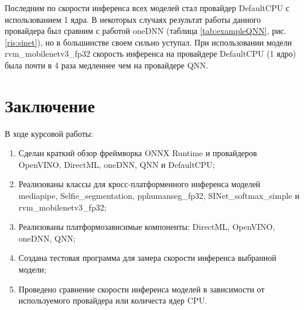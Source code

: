 \documentclass[a4paper,14pt]{extreport}
\begin{document}
        Последним по скорости инференса всех моделей стал провайдер DefaultCPU с использованием 1 ядра. В некоторых случаях результат работы данного провайдера был сравним с работой oneDNN (таблица \ref{tab:exampleQNN}, рис. \ref{ris:sinet}), но в большинстве своем сильно уступал. При использовании модели rvm\_mobilenetv3\_fp32 скорость инференса на провайдере DefaultCPU (1 ядро) была почти в 4 раза медленнее чем на провайдере QNN.

    \chapter*{Заключение}
    В ходе курсовой работы:
    \begin{enumerate}
        \item Сделан краткий обзор фреймворка ONNX Runtime и провайдеров OpenVINO, DirectML, oneDNN, QNN и DefaultCPU;
        \item Реализованы классы для кросс-платформенного инференса моделей mediapipe, Selfie\_segmentation, pphumanseg\_fp32, SINet\_softmax\_simple и rvm\_mobilenetv3\_fp32; 
        \item Реализованы платформозависимые компоненты: DirectML, OpenVINO, oneDNN, QNN;
        \item Создана тестовая программа для замера скорости инференса выбранной модели;
        \item Проведено сравнение скорости инференса моделей в зависимости от используемого провайдера или количеста ядер CPU.
    \end{enumerate}
\end{document}
